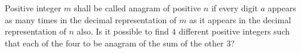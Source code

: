 Positive integer $m$ shall be called anagram  of positive $n$ if every digit $a$ appears as many times in the decimal representation of $m$ as it appears in the decimal representation of $n$ also. Is it possible to find $4$ different positive integers such that each of the four to be anagram  of the sum of the other $3$?
